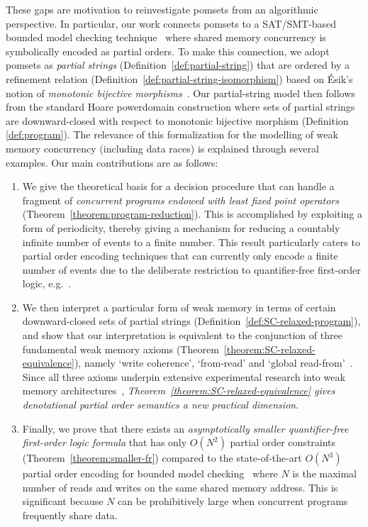\documentclass{llncs}
\begin{document}
These gaps are motivation to reinvestigate pomsets from an algorithmic perspective. In particular, our work connects pomsets to a SAT/SMT-based bounded model checking technique~\cite{AKT2013} where shared memory concurrency is symbolically encoded as partial orders. To make this connection, we adopt pomsets as \emph{partial strings} (Definition~\ref{def:partial-string}) that are ordered by a refinement relation (Definition~\ref{def:partial-string-isomorphism}) based on \'{E}sik's notion of \emph{monotonic bijective morphisms}~\cite{E2002}. Our partial-string model then follows from the standard Hoare powerdomain construction where sets of partial strings are downward-closed with respect to monotonic bijective morphism (Definition \ref{def:program}). The relevance of this formalization for the modelling of weak memory concurrency (including data races) is explained through several examples. Our main contributions are as follows:
\begin{enumerate}
\item We give the theoretical basis for a decision procedure that can handle a fragment of \emph{concurrent programs endowed with least fixed point operators} (Theorem~\ref{theorem:program-reduction}). This is accomplished by exploiting a form of periodicity, thereby giving a mechanism for reducing a countably infinite number of events to a finite number. This result particularly caters to partial order encoding techniques that can currently only encode a finite number of events due to the deliberate restriction to quantifier-free first-order logic, e.g.~\cite{AKT2013}.
\item We then interpret a particular form of weak memory in terms of certain downward-closed sets of partial strings (Definition~\ref{def:SC-relaxed-program}), and show that our interpretation is equivalent to the conjunction of three fundamental weak memory axioms (Theorem~\ref{theorem:SC-relaxed-equivalence}), namely `write coherence', `from-read' and `global read-from'~\cite{AMSS2012}. Since all three axioms underpin extensive experimental research into weak memory architectures~\cite{AMSS2011}, \emph{Theorem~\ref{theorem:SC-relaxed-equivalence} gives denotational partial order semantics a new practical dimension}.
\item Finally, we prove that there exists an \emph{asymptotically smaller quantifier-free first-order logic formula} that has only $O(N^2)$ partial order constraints (Theorem~\ref{theorem:smaller-fr}) compared to the state-of-the-art $O(N^3)$ partial order encoding for bounded model checking~\cite{AKT2013} where $N$ is the maximal number of reads and writes on the same shared memory address. This is significant because $N$ can be prohibitively large when concurrent programs frequently share data.
\end{enumerate}
\end{document}

